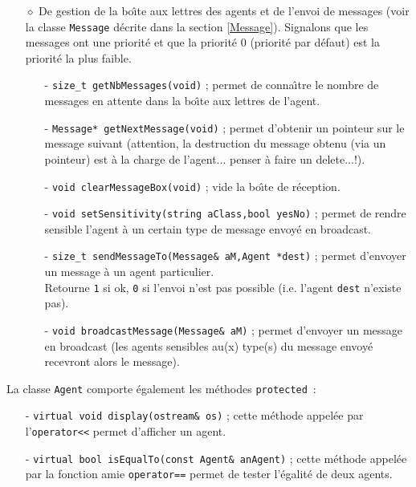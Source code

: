 \documentclass[12pt]{article}
\begin{document}
\begin{itemize}
\vspace{-0.4cm}
\label{boite}
\item[$\diamond$] De gestion de la bo\^ \i te aux lettres des agents
et de l'envoi de messages
(voir la classe {\tt Message} d\'ecrite dans la section \ref{Message}).
Signalons que les messages ont une priorit\'e et que la priorit\'e
0 (priorit\'e par d\'efaut) est la priorit\'e la plus faible.
\begin{itemize}
\vspace{-0.2cm}
\item[-] {\tt size\_t getNbMessages(void)} ; permet de conna\^ \i tre
le nombre de messages en attente dans la bo\^ \i te aux lettres
de l'agent.
\vspace{-0.2cm}
\item[-] {\tt Message* getNextMessage(void)} ; permet d'obtenir un
pointeur sur le message suivant (attention, la
destruction du message obtenu (via un pointeur) est \`a la
charge de l'agent... penser \`a faire un delete...!).
\vspace{-0.2cm}
\item[-] {\tt void clearMessageBox(void)} ; vide la bo\^ \i te de
r\'eception.
\vspace{-0.2cm}
\item[-] {\tt void setSensitivity(string aClass,bool yesNo)} ;
permet de rendre sensible l'agent \`a un certain type de
message envoy\'e en broadcast.
\vspace{-0.2cm}
\item[-] {\tt size\_t sendMessageTo(Message\& aM,Agent *dest)} ; permet
d'envoyer un message \`a un agent particulier.\\
Retourne {\tt 1} si ok, {\tt 0} si l'envoi n'est pas possible
(i.e. l'agent {\tt dest} n'existe pas).
\vspace{-0.6cm}
\item[-] {\tt void broadcastMessage(Message\& aM)} ; permet
d'envoyer un message en broadcast (les agents sensibles au(x) type(s)
du message envoy\'e recevront alors le message).
\end{itemize}
\end{itemize}

\vspace{-0.3cm}

La classe {\tt Agent} comporte \'egalement les m\'ethodes {\tt protected}~:
\begin{itemize}
\vspace{-0.2cm}
\item[-] {\tt virtual void display(ostream\& os)} ; cette m\'ethode
appel\'ee par l'{\tt operator<<} permet d'afficher un agent.
\vspace{-0.2cm}
\item[-] {\tt virtual bool isEqualTo(const Agent\& anAgent)} ; cette
m\'ethode appel\'ee par la fonction amie {\tt operator==} permet
de tester l'\'egalit\'e de deux agents.
\end{itemize}
\end{document}

